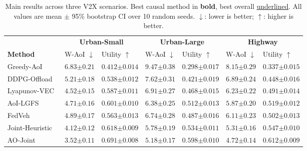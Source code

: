 \documentclass[final,3p,times,review,sort&compress]{elsarticle}
\begin{document}
\begin{table}[t!]
\centering
\caption{Main results across three V2X scenarios. Best causal method in \textbf{bold}, best overall \underline{underlined}. All values are mean $\pm$ 95\% bootstrap CI over 10 random seeds. $\downarrow$: lower is better; $\uparrow$: higher is better.}
\label{tab:main_results}
\begin{tabularx}{\textwidth}{l *{6}{X}}
\toprule
 & \multicolumn{2}{c}{\textbf{Urban-Small}} & \multicolumn{2}{c}{\textbf{Urban-Large}} & \multicolumn{2}{c}{\textbf{Highway}} \\
\cmidrule(lr){2-3}\cmidrule(lr){4-5}\cmidrule(lr){6-7}
\textbf{Method} & W-AoI $\downarrow$ & Utility $\uparrow$ & W-AoI $\downarrow$ & Utility $\uparrow$ & W-AoI $\downarrow$ & Utility $\uparrow$ \\
\midrule
Greedy-AoI & $6.83{\scriptstyle\pm0.21}$ & $0.412{\scriptstyle\pm0.014}$ & $9.47{\scriptstyle\pm0.38}$ & $0.298{\scriptstyle\pm0.017}$ & $8.15{\scriptstyle\pm0.29}$ & $0.337{\scriptstyle\pm0.015}$ \\
DDPG-Offload~\cite{ZHAO2023103193} & $5.21{\scriptstyle\pm0.18}$ & $0.538{\scriptstyle\pm0.012}$ & $7.62{\scriptstyle\pm0.31}$ & $0.421{\scriptstyle\pm0.019}$ & $6.89{\scriptstyle\pm0.24}$ & $0.448{\scriptstyle\pm0.016}$ \\
Lyapunov-VEC~\cite{KANG2026111852} & $4.52{\scriptstyle\pm0.15}$ & $0.587{\scriptstyle\pm0.011}$ & $6.91{\scriptstyle\pm0.27}$ & $0.468{\scriptstyle\pm0.015}$ & $6.23{\scriptstyle\pm0.22}$ & $0.491{\scriptstyle\pm0.014}$ \\
AoI-LGFS~\cite{MOHAMMED2025111706} & $4.71{\scriptstyle\pm0.16}$ & $0.601{\scriptstyle\pm0.010}$ & $6.38{\scriptstyle\pm0.25}$ & $0.512{\scriptstyle\pm0.013}$ & $5.87{\scriptstyle\pm0.20}$ & $0.519{\scriptstyle\pm0.012}$ \\
FedVeh~\cite{TU2026112020} & $4.89{\scriptstyle\pm0.17}$ & $0.563{\scriptstyle\pm0.013}$ & $6.74{\scriptstyle\pm0.28}$ & $0.487{\scriptstyle\pm0.016}$ & $6.11{\scriptstyle\pm0.23}$ & $0.502{\scriptstyle\pm0.013}$ \\
\midrule
Joint-Heuristic & $4.12{\scriptstyle\pm0.12}$ & $0.618{\scriptstyle\pm0.009}$ & $5.78{\scriptstyle\pm0.19}$ & $0.534{\scriptstyle\pm0.011}$ & $5.31{\scriptstyle\pm0.16}$ & $0.547{\scriptstyle\pm0.010}$ \\
AO-Joint & $3.52{\scriptstyle\pm0.11}$ & $0.691{\scriptstyle\pm0.008}$ & $5.18{\scriptstyle\pm0.17}$ & $0.598{\scriptstyle\pm0.010}$ & $4.72{\scriptstyle\pm0.14}$ & $0.612{\scriptstyle\pm0.009}$ \\

\end{tabularx}
\end{table}
\end{document}
